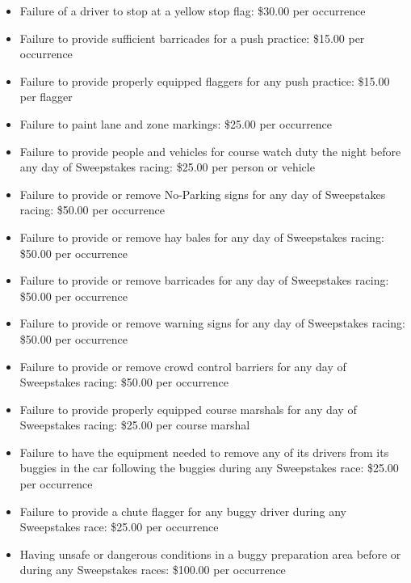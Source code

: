 \begin{appendices}
\begin{itemize}
			\item Failure of a driver to stop at a yellow stop flag: \$30.00 per
			occurrence

			\item Failure to provide sufficient barricades for a push practice: \$15.00
			per occurrence

			\item Failure to provide properly equipped flaggers for any push practice:
			\$15.00 per flagger

			\item Failure to paint lane and zone markings: \$25.00 per occurrence

			\item Failure to provide people and vehicles for course watch duty the
			night before any day of Sweepstakes racing: \$25.00 per person or vehicle

			\item Failure to provide or remove No-Parking signs for any day of
			Sweepstakes racing: \$50.00 per occurrence

			\item Failure to provide or remove hay bales for any day of Sweepstakes
			racing: \$50.00 per occurrence

			\item Failure to provide or remove barricades for any day of Sweepstakes
			racing: \$50.00 per occurrence

			\item Failure to provide or remove warning signs for any day of Sweepstakes
			racing: \$50.00 per occurrence

			\item Failure to provide or remove crowd control barriers for any day of
			Sweepstakes racing: \$50.00 per occurrence

			\item Failure to provide properly equipped course marshals for any day of
			Sweepstakes racing: \$25.00 per course marshal

			\item Failure to have the equipment needed to remove any of its drivers
			from its buggies in the car following the buggies during any Sweepstakes race:
			\$25.00 per occurrence

			\item Failure to provide a chute flagger for any buggy driver during any
			Sweepstakes race: \$25.00 per occurrence

			\item Having unsafe or dangerous conditions in a buggy preparation area
			before or during any Sweepstakes races: \$100.00 per occurrence

		\end{itemize}

\end{appendices}
